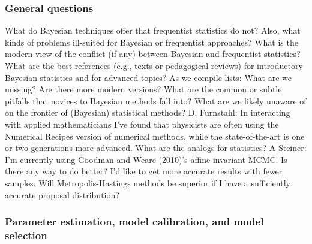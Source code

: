 \subsubsection{General questions}

  \bi
    \I What do Bayesian techniques offer that frequentist
      statistics do not?
    \bi
      \I Also, what kinds of problems ill-suited for
	Bayesian or frequentist approaches?
    \ei
    \I What is the modern view of the conflict (if any)
      between Bayesian and frequentist statistics?
    \I What are the best references (e.g., texts or
      pedagogical reviews) for introductory Bayesian
      statistics and for advanced topics?
    \bi
      \I As we compile lists: What are we missing? Are there
	more modern versions?
    \ei
    \I What are the common or subtle pitfalls that novices to
      Bayesian methods fall into?
    \I What are we likely unaware of on the frontier of
      (Bayesian) statistical methods?
    \bi
      \I D. Furnstahl: In
	interacting with applied mathematicians I've found that
	physicists are often using the Numerical Recipes version
	of numerical methods, while the state-of-the-art is one
	or two generations more advanced. What are the analogs
	for statistics?
      \I A Steiner: I'm currently using Goodman and Weare
	(2010)'s affine-invariant MCMC. Is there any way
	to do better? I'd like to get more accurate results
	with fewer samples. Will Metropolis-Hastings methods
	be superior if I have a sufficiently accurate
	proposal distribution?
    \ei
  \ei
  
  \subsubsection{Parameter estimation, model calibration, and
      model selection}

